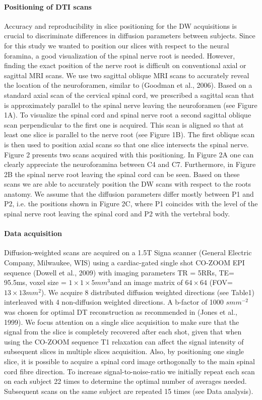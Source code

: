 \paragraph{Positioning of DTI scans} Accuracy and reproducibility in slice positioning for the DW acquisitions is crucial to discriminate differences in diffusion parameters between subjects. Since for this study we wanted to position our slices with respect to the neural foramina, a good visualization of the spinal nerve root is needed. However, finding the exact position of the nerve root is difficult on conventional axial or sagittal MRI scans. We use two sagittal oblique MRI scans to accurately reveal the location of the neuroforamen, similar to (Goodman et al., 2006). Based on a standard axial scan of the cervical spinal cord, we prescribed a sagittal scan that is approximately parallel to the spinal nerve leaving the neuroforamen (see Figure 1A). To visualize the spinal cord and spinal nerve root a second sagittal oblique scan perpendicular to the first one is acquired. This scan is aligned so that at least one slice is parallel to the nerve root (see Figure 1B). The first oblique scan is then used to position axial scans so that one slice intersects the spinal nerve. Figure 2 presents two scans acquired with this positioning. In Figure 2A one can clearly appreciate the neuroforamina between C4 and C7. Furthermore, in Figure 2B the spinal nerve root leaving the spinal cord can be seen. Based on these scans we are able to accurately position the DW scans with respect to the roots anatomy. We assume that the diffusion parameters differ mostly between P1 and P2, i.e. the positions shown in Figure 2C, where P1 coincides with the level of the spinal nerve root leaving the spinal cord and P2 with the vertebral body.

\paragraph{Data acquisition} Diffusion-weighted scans are acquired on a 1.5T Signa scanner (General Electric Company, Milwaukee, WIS) using a cardiac-gated single shot CO-ZOOM EPI sequence (Dowell et al., 2009) with imaging parameters TR = 5RRs, TE= 95.5ms, voxel size = $1\times 1 \times 5mm^3$and an image matrix of $64\times 64$ (FOV=$13\times 13mm^2$). We acquire 8 distributed diffusion weighted directions (see Table1) interleaved with 4 non-diffusion weighted directions. A b-factor of 1000 $smm^{-2}$ was chosen for optimal DT reconstruction as recommended in (Jones et al., 1999). We focus attention on a single slice acquisition to make sure that the signal from the slice is completely recovered after each shot, given that when using the CO-ZOOM sequence T1 relaxation can affect the signal intensity of subsequent slices in multiple slices acquisition. Also, by positioning one single slice, it is possible to acquire a spinal cord image orthogonally to the main spinal cord fibre direction. To increase signal-to-noise-ratio we initially repeat each scan on each subject 22 times to determine the optimal number of averages needed. Subsequent scans on the same subject are repeated 15 times (see Data analysis). 

